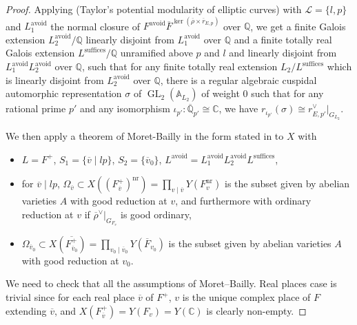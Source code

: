 \documentclass[10pt]{article}
\theoremstyle{definition}
\numberwithin{equation}{theorem}
\newcommand{\AAA}{\mathbb{A}}
\newcommand{\CC}{\mathbb{C}}
\newcommand{\QQ}{\mathbb{Q}}
\newcommand{\calL}{\mathcal{L}}
\DeclareMathOperator{\GL}{GL}
\begin{document}
\begin{proof}
Applying \cite[Theorem~7.2.4]{ACC+18} (Taylor's potential modularity of elliptic curves) with $\calL=\{l,p\}$ and $L_1^\text{avoid}$ the normal closure of $F^\text{avoid}\overline{F}^{\ker(\overline{\rho}\times\overline{r}_{E,p})}$ over $\QQ$, we get a finite Galois extension $L_2^\text{avoid}/\QQ$ linearly disjoint from $L_1^\text{avoid}$ over $\QQ$ and a finite totally real Galois extension $L^\text{suffices}/\QQ$ unramified above $p$ and $l$ and linearly disjoint from $L_1^\text{avoid}L_2^\text{avoid}$ over $\QQ$, such that for any finite totally real extension $L_2/L^\text{suffices}$ which is linearly disjoint from $L_2^\text{avoid}$ over $\QQ$, there is a regular algebraic cuspidal automorphic representation $\sigma$ of $\GL_2(\AAA_{L_2})$ of weight $0$ such that for any rational prime $p'$ and any isomorphism $\iota_{p'}:\overline{\QQ}_{p'}\cong\CC$, we have $r_{\iota_{p'}}(\sigma)\cong r_{E,p'}^\vee|_{G_{L_2}}$. 

We then apply a theorem of Moret-Bailly in the form stated in \cite[Theorem~3.1]{AN19} to $X$ with
\begin{itemize}
    \item $L=F^+$, $S_1=\{\overline{v}\mid lp\}$, $S_2=\{\overline{v}_0\}$, $L^\text{avoid}=L_1^\text{avoid}L_2^\text{avoid}L^\text{suffices}$,
    \item for $\overline{v}\mid lp$, $\Omega_{\overline{v}}\subset X((F^+_{\overline{v}})^\text{nr})=\prod_{v\mid\overline{v}}Y(F_v^\text{nr})$ is the subset given by abelian varieties $A$ with good reduction at $v$, and furthermore with ordinary reduction at $v$ if $\overline{\rho}^\vee|_{G_{F_v}}$ is good ordinary,
    \item $\Omega_{\overline{v}_0}\subset X(\overline{F^+_{\overline{v}_0}})=\prod_{v_0\mid\overline{v}_0}Y(\overline{F}_{v_0})$ is the subset given by abelian varieties $A$ with good reduction at $v_0$.
\end{itemize}

We need to check that all the assumptions of Moret--Bailly. Real places case is trivial since for each real place $\overline{v}$ of $F^+$, $v$ is the unique complex place of $F$ extending $\overline{v}$, and $X(F^+_{\overline{v}})=Y(F_v)=Y(\CC)$ is clearly non-empty.


\end{proof}
\end{document}
